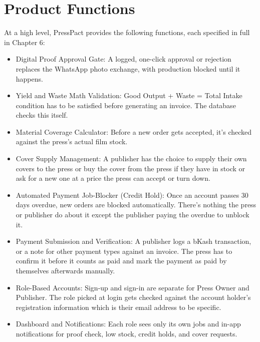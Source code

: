 \documentclass{scrreprt}
\begin{document}
\section{Product Functions}
At a high level, PressPact provides the following functions, each specified in full in Chapter 6:
\begin{itemize}
\item Digital Proof Approval Gate: A logged, one-click approval or rejection replaces the WhatsApp photo exchange, with production blocked until it happens.
\item Yield and Waste Math Validation: Good Output + Waste = Total Intake condition has to be satisfied before generating an invoice. The database checks this itself.
\item Material Coverage Calculator: Before a new order gets accepted, it's checked against the press's actual film stock.
\item Cover Supply Management: A publisher has the choice to supply their own covers to the press or buy the cover from the press if they have in stock or ask for a new one at a price the press can accept or turn down.
\item Automated Payment Job-Blocker (Credit Hold): Once an account passes 30 days overdue, new orders are blocked automatically. There's nothing the press or publisher do about it except the publisher paying the overdue to unblock it.
\item Payment Submission and Verification: A publisher logs a bKash transaction, or a note for other payment types against an invoice. The press has to confirm it before it counts as paid and mark the payment as paid by themselves afterwards manually.
\item Role-Based Accounts: Sign-up and sign-in are separate for Press Owner and Publisher. The role picked at login gets checked against the account holder's registration information which is their email address to be specific.
\item Dashboard and Notifications: Each role sees only its own jobs and in-app notifications for proof check, low stock, credit holds, and cover requests.
\end{itemize}
\end{document}
